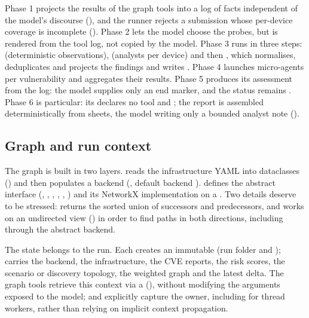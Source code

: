 Phase 1 projects the results of the graph tools into a log of facts independent
of the model's discourse
(), and the runner rejects
a submission whose per-device coverage is incomplete
(). Phase 2 lets the model choose the probes, but
 is rendered from the tool log, not copied by the model. Phase
3 runs in three steps:  (deterministic observations),
 (analysts per device) and then
, which normalises, deduplicates and projects the
findings and writes . Phase 4 launches micro-agents
per vulnerability and aggregates their results. Phase 5 produces its assessment
from the log: the model supplies only an end marker, and the status remains
. Phase 6 is particular: its
 declares no tool and ; the report is
assembled deterministically from sheets, the model writing only a bounded analyst
note ().

\subsection{Graph and run context}

The graph is built in two layers.  reads the infrastructure
YAML into dataclasses () and then populates a backend
(, default backend ).
 defines the abstract interface 
(, , ,
, , ) and its
NetworkX implementation on a . Two details deserve to be stressed:
 returns the sorted union of successors and predecessors, and
 works on an undirected view () in
order to find paths in both directions, including through the abstract backend.

The state belongs to the run. Each  creates an immutable
 (run folder and ); 
carries the backend, the infrastructure, the CVE reports, the risk scores, the
scenario or discovery topology, the weighted graph and the latest delta. The graph
tools retrieve this context via a 
(), without modifying the arguments exposed
to the model;  and  explicitly
capture the owner, including for thread workers, rather than relying on implicit
context propagation.

